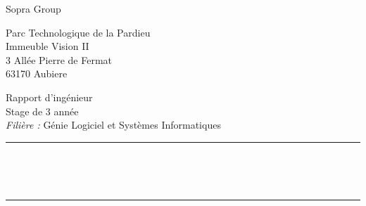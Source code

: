 \begin{multicols}{2}
\begin{flushright}
		Sopra Group
		
		\vspace*{0.5cm}
		
		Parc Technologique de la Pardieu									\\
		Immeuble Vision II													\\
		3 Allée Pierre de Fermat											\\
		63170 Aubiere		
		
		
	\end{flushright}
\end{multicols}

\vspace*{\fill}

\begin{center}


	\Large
	Rapport d'ingénieur													\\
	Stage de 3 année											\\
	\textit{Filière :} Génie Logiciel et Systèmes Informatiques
	
	\rule{16cm}{2pt}													\\
	\vspace*{0.35cm}
	
	\huge
	\textbf{\@title}													\\

	\rule{16cm}{2pt}
	

\end{center}
	
\vspace*{\fill}

